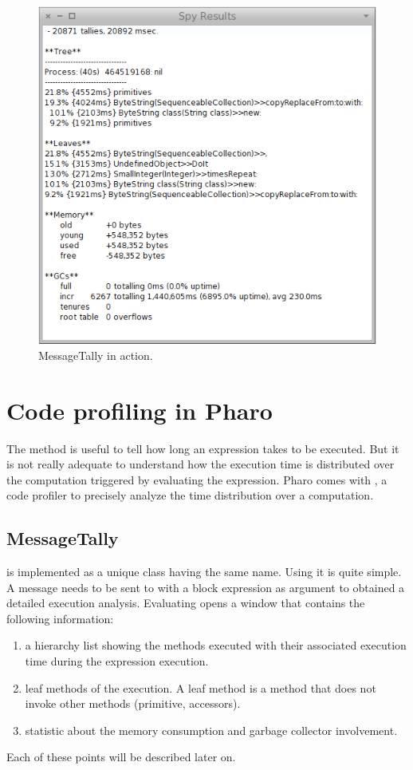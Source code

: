 \documentclass[a4paper,10pt,twoside]{book}
\begin{document}
\begin{figure}
	\begin{center}
	\includegraphics[width=.8\linewidth]{MessageTallyOne}
	\caption{MessageTally in action.}
	\end{center}
\end{figure}


\section{Code profiling in Pharo} 

The  method is useful to tell how long an expression takes to be executed. But it is not really adequate to understand how the execution time is distributed over the computation triggered by evaluating the expression. Pharo comes with , a code profiler to precisely analyze the time distribution over a computation. 


\subsection{MessageTally}
 is implemented as a unique class having the same name. Using it is quite simple. A message  needs to be sent to  with a block expression as argument to obtained a detailed execution analysis. Evaluating  opens a window that contains the following information:

\begin{enumerate}
\item a hierarchy list showing the methods executed with their associated execution time during the expression execution.

\item leaf methods of the execution. A leaf method is a method that does not invoke other methods (\eg primitive, accessors). 

\item statistic about the memory consumption and garbage collector involvement.

\end{enumerate}
Each of these points will be described later on.
\end{document}
